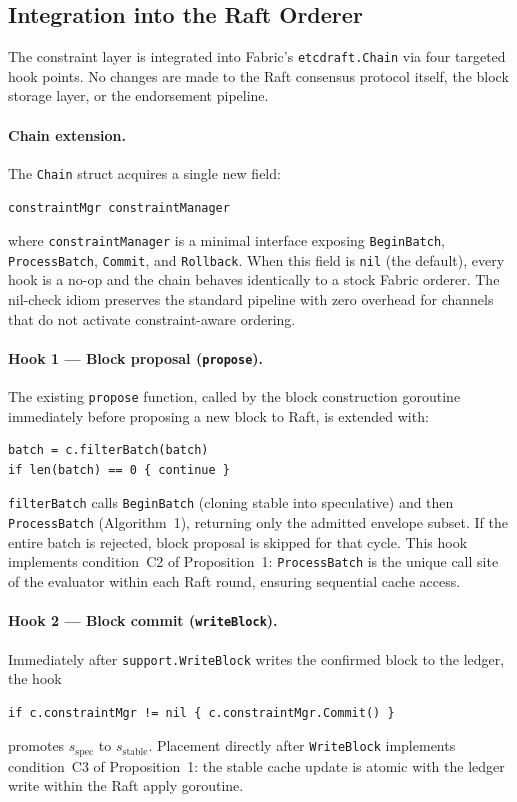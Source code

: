 \subsection{Integration into the Raft Orderer}
\label{subsec:impl-raft}

The constraint layer is integrated into Fabric's \texttt{etcdraft.Chain} via
four targeted hook points.  No changes are made to the Raft consensus protocol
itself, the block storage layer, or the endorsement pipeline.

\paragraph{Chain extension.}
The \texttt{Chain} struct acquires a single new field:
\begin{verbatim}
constraintMgr constraintManager
\end{verbatim}
where \texttt{constraintManager} is a minimal interface exposing
\texttt{BeginBatch}, \texttt{ProcessBatch}, \texttt{Commit}, and
\texttt{Rollback}.  When this field is \texttt{nil} (the default), every hook
is a no-op and the chain behaves identically to a stock Fabric orderer.
The nil-check idiom preserves the standard pipeline with zero overhead for
channels that do not activate constraint-aware ordering.

\paragraph{Hook 1 — Block proposal (\texttt{propose}).}
The existing \texttt{propose} function, called by the block construction
goroutine immediately before proposing a new block to Raft, is extended with:
\begin{verbatim}
batch = c.filterBatch(batch)
if len(batch) == 0 { continue }
\end{verbatim}
\texttt{filterBatch} calls \texttt{BeginBatch} (cloning stable into speculative)
and then \texttt{ProcessBatch} (Algorithm~1), returning only the admitted
envelope subset.  If the entire batch is rejected, block proposal is skipped
for that cycle.  This hook implements condition~C2 of Proposition~1:
\texttt{ProcessBatch} is the unique call site of the evaluator within each
Raft round, ensuring sequential cache access.

\paragraph{Hook 2 — Block commit (\texttt{writeBlock}).}
Immediately after \texttt{support.WriteBlock} writes the confirmed block to
the ledger, the hook
\begin{verbatim}
if c.constraintMgr != nil { c.constraintMgr.Commit() }
\end{verbatim}
promotes $s_\text{spec}$ to $s_\text{stable}$.  Placement directly after
\texttt{WriteBlock} implements condition~C3 of Proposition~1: the stable cache
update is atomic with the ledger write within the Raft apply goroutine.

